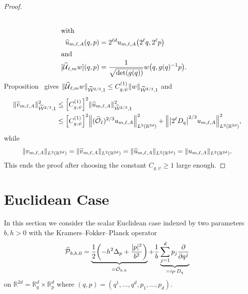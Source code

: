 \documentclass[AHL,Unicode,longabstracts]{cedram}
\newcommand{\R}{\mathbb{R}}
\newcommand{\clW}{\mathcal{W}}
\newcommand{\clO}{\mathcal{O}}
\newcommand{\clP}{\mathcal{P}}
\newcommand{\clU}{\mathcal{U}}
\let\oldtilde\tilde
\renewcommand*{\tilde}[1]{\mathchoice{\widetilde{#1}}{\widetilde{#1}}{\oldtilde{#1}}{\oldtilde{#1}}}
\let\oldhat\hat
\renewcommand*{\hat}[1]{\mathchoice{\widehat{#1}}{\widehat{#1}}{\oldhat{#1}}{\oldhat{#1}}}
\let\originalleft\left
\let\originalright\right
\renewcommand{\left}{\mathopen{}\mathclose\bgroup\originalleft}
\renewcommand{\right}{\aftergroup\egroup\originalright}
\begin{document}
\begin{proof}
\begin{align*}
\\
\intertext{with}
\hat{u}_{m,\ell,A}(q, p) &= 2^{\ell d}u_{m,\ell,A}\left(2^{\ell}q,2^{\ell}p\right)\\
\intertext{and}
[\hat{\clU}_{\ell,m}w](q,p)&=\frac{1}{\sqrt{\det (g(q))}} w\left(q,g(q)^{-1}p\right).
\end{align*}
Proposition~\label{pr:Wsplatchange}
gives $\|\hat{\clU}_{\ell,m}w\|_{\widetilde{\clW}^{2/3},1}\leq C_{g,\psi}^{(1)} \|w\|_{\widetilde{\clW}^{2/3},1}$ and
\begin{align*}
\|\tilde{v}_{m,\ell,A}\|_{\widetilde{\clW}^{2/3},1}^2 &\leq \left[C_{g,\psi}^{(1)}\right]^2 \|\hat{u}_{m,\ell,A}\|_{\widetilde{\clW}^{2/3},1}^2
\\
&\leq \left[C_{g,\psi}^{(1)}\right]^2 \left\|(\tilde{\clO}_{\ell})^{2/3}u_{m,\ell,A}\right\|_{L^2(\R^{2d})}^2 + \left\|\left|2^{\ell}D_q\right|^{2/3}u_{m,\ell,A}\right\|_{L^2(\R^{2d})}^2,
\end{align*}
while
\[
\|v_{m,\ell,A}\|_{L^2(\R^{2d})}=\|\tilde{v}_{m,\ell,A}\|_{L^2(\R^{2d})}=\|\hat{u}_{m,\ell,A}\|_{L^2(\R^{2d})}=\|u_{m,\ell,A}\|_{L^2(\R^{2d})}.
\]
This ends the proof after choosing the constant $C_{g,\psi}\geq 1$ large enough.
\end{proof}

\section{Euclidean Case}\label{sec:EuclCase}

In this section we consider the scalar Euclidean case indexed by two parameters $b,h>0$ with the Kramers--Fokker--Planck operator
\begin{equation}
\hat{\clP}_{b,h,0}=\underbrace{\frac{1}{2}\left(-h^2\Delta_{p} + \frac{|p|^{2}}{b^2}\right)}_{=\hat{\clO}_{b,h}} + \frac{1}{b}\underbrace{\sum_{j=1}^{d} p_{j}\frac{\partial}{\partial q^{j}}}_{=i p\cdot D_q}
\end{equation}
on $\R^{2d} = \R^d_q \times \R^d_p$ where $(q,p) = (q^1, \dots, q^d, p_1, \dots, p_d)$.
\end{document}
